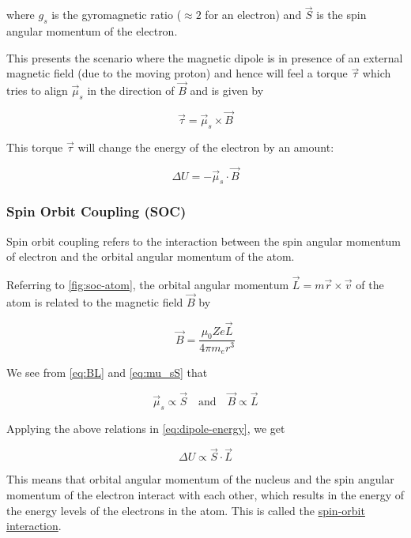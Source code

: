 where \( g_s \) is the gyromagnetic ratio (\( \approx 2 \) for an electron) and \( \vec{S} \) is the spin angular momentum of the electron.

This presents the scenario where the magnetic dipole is in presence of an external magnetic field (due to the moving proton) and hence will feel a torque \( \vec{\tau} \) which tries to align \( \vec{\mu}_s \) in the direction of \( \vec{B} \) and is given by

\begin{equation}
    \vec{\tau} = \vec{\mu}_s \times \vec{B}
\end{equation}

This torque \( \vec{\tau} \) will change the energy of the electron by an amount:

\begin{equation} \label{eq:dipole-energy}
    \Delta U = - \vec{\mu}_s \cdot \vec{B}
\end{equation}


\subsubsection{Spin Orbit Coupling (SOC)}

Spin orbit coupling refers to the interaction between the spin angular momentum of electron and the orbital angular momentum of the atom.

Referring to \cref{fig:soc-atom}, the orbital angular momentum \( \vec{L} = m \vec{r} \times \vec{v} \) of the atom is related to the magnetic field \( \vec{B} \) by

\begin{equation} \label{eq:BL}
    \vec{B} = \frac{\mu_0 Z e \vec{L}}{4 \pi m_e r^3}
\end{equation}

We see from \cref{eq:BL} and \cref{eq:mu_sS} that

\begin{equation*}
    \vec{\mu}_s \propto \vec{S} \quad \text{and} \quad \vec{B} \propto \vec{L}
\end{equation*}

Applying the above relations in \cref{eq:dipole-energy}, we get

\begin{equation}
    \Delta U \propto \vec{S} \cdot \vec{L}
\end{equation}

This means that orbital angular momentum of the nucleus and the spin angular momentum of the electron interact with each other, which results in the energy of the energy levels of the electrons in the atom.
This is called the \underline{spin-orbit interaction}.

